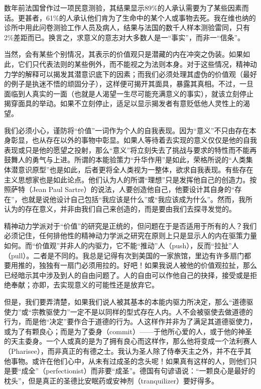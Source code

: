 \documentclass[11pt,oneside]{book}
\begin{document}
\begin{common-format}
数年前法国曾作过一项民意测验，其结果显示89\%{}的人承认需要为了某些因素而话。更甚者，61\%{}的人承认他们肯为了生命中的某个人或事物去死。我在维也纳的诊所中用此问卷测验工作人员及病人，结果与法国的数千人样本测验雷同，只有2\%{}差距而已。换言之，求意义的意志对大多数人是一“事实”，而非一“信条”。

当然，会有某些个别情况，其表示的价值观只是潜藏的内在冲突之伪装。如果如此，它们只代表法则的某些例外，而不能视之为法则本身。对于这些情况，精神动力学的解释可以揭发其潜意识底下的因素；而我们必须处理其虚伪的价值观（最好的例子是执迷不悟的顽固分子），这样便可揭开其面具，暴露其真相。不过，一旦面临到人真实的一面（也就是人渴望一生尽可能充满意义的事实），就该立刻停止揭穿面具的举动。如果不立刻停止，适足以显示揭发者有意贬低他人灵性上的渴望。

我们必须小心，谨防将“价值”一词作为个人的自我表现。因为“意义”不只由存在本身彰显，也从存在以外的事物中彰显。如果人等待着去实现的意义仅仅是他的自我表现或只是他的愿望之投射，那么“意义”将立刻失去了挑战与要求的特性而不能再鼓舞人的勇气与上进。所谓的本能验策力“升华作用”是如此，荣格所说的“人类集体潜意识原型”也是如此，后者更将全人类视为一整体，欲求自我表现。有些存在主义思想家也是如此论点。他们认为人的所谓“理想”只是发挥他自己的创造力。按照萨特（Jean Paul Sartre）的说法，人要创造他自己，他要设计其自身的“存在”，也就是说他设计自己包括“我应该是什么”或“我应该成为什么”。然而，我所认为的存在意义，并非由我们自己来创造的，而是要由我们去探寻发觉的。

精神动力学派对于“价值”的研究是正统的，但问题在于是否适用于所有的人？我们必须记住，任何排他性的精神动力学派之研究在原则上只是显示人的内在驱策力量如何。而“价值观”并非人的内驱力，它不能“推动”人（push），反而“拉扯”人（pull）。二者是不同的。我总是记得有次到美国的一家旅馆，里边有许多扇门都要用推的，独独有一扇门必须用拉的。好吧！如果我说人被他的价值观拉扯，那么已经暗示其中涉及到人的自由问题了。人的自由可以作他自己的抉择，接受或是拒绝奉献；亦即，去实现意义的可能性还是放弃它。

但是，我们要弄清楚，如果我们说人被其基本的本能内驱力所决定，那么“道德驱使力”或“宗教驱使力”一定不是以同样的型式存在人内。人不会被驱使去做道德的行为，而是他“决定”要作合于道德的行为。人这样作并非为了满足其道德驱使力，或为了有颗良心；而是为了委身（commit）——于他所心爱的人，或于他的神圣的天主委身。一个人或真的是为了拥有良心而这样作，那么他将变成一个法利赛人（Pharisee），而非真正的有德之士。我认为圣人除了侍奉天主之外，并不在乎其他事物。或许在他们心中，从未有过成圣的念头呢！如果真有这样的人，则他们只是要“成全”（perfectionist）而非要“成圣”。德国有句谚语说：“一颗良心是最好的枕头”，但是真正的圣德比安眠药或安神剂（tranquilizer）要好得多。


\end{common-format}
\end{document}
